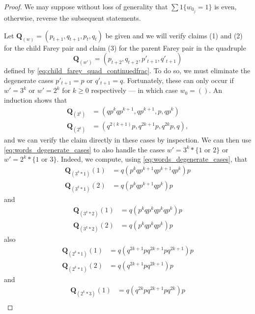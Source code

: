 \documentclass[12pt]{amsart}
\begin{document}
\begin{proof}
	We may suppose without loss of generality that $\sum 1\{w_{{0}_j}=1\}$ is even, otherwise, reverse the subsequent statements. 
	
	Let $\mathbf{Q}_{(w)} = (p_{t+1}, q_{t+1}, p_{t}, q_{t})$ be given and we will verify claims (1) and (2) for 
	the child Farey pair and claim (3) for the parent Farey pair  in the quadruple
	\[
	\mathbf{Q}_{(w')} = (p_{t+2}, q_{t+2}, p'_{t+1}, q'_{t+1})
	\]
	defined by \eqref{eq:child_farey_quad_continuedfrac}.  %
	To do so, we must eliminate the degenerate cases $p'_{t+1} = p$ or $q'_{t+1} = q$. Fortunately, 
	these can only occur if $w' = 3^k$ or $w' = 2^k$ for $k \geq 0 $ respectively --- in which case $w_0 = ()$. An induction shows that
	\begin{equation} \label{eq:words_degenerate_cases}
	\begin{aligned}
	\mathbf{Q}_{(3^k)} &= (q p^k q p^{k+1}, q p^{k+1}, p, q p^k) \\
	\mathbf{Q}_{(2^k)} &= (q^{2(k+1)} p, q^{2k + 1} p, q ^{2 k} p , q),
	\end{aligned}
	\end{equation}
	and we can verify the claim directly in these cases by inspection. We can then use \eqref{eq:words_degenerate_cases} to also handle the cases $w' = 3^k*\{1 \mbox{ or } 2\}$ or $w' = 2^k*\{1 \mbox{ or }3\}$. Indeed, we compute, using  \eqref{eq:words_degenerate_cases}, that 
	\[
	\begin{aligned}
	\mathbf{Q}_{(3^k*1)}(1) &= q (p^k q p^{k+1} q p^{k+1} q p^{k} )p \\
	\mathbf{Q}_{(3^k*1)}(2) &= q (p^k q p^{k+1} q p^{k}) p 
	\end{aligned}
	\]
	and
	\[
	\begin{aligned}
	\mathbf{Q}_{(3^k*2)}(1) &= q (p^k q p^k q p^k q p^k ) p  \\
	\mathbf{Q}_{(3^k*2)}(2) &= q (p^k q p^k q p^k ) p 
	\end{aligned}
	\]
	also
	\[
	\begin{aligned}
	\mathbf{Q}_{(2^k*1)}(1) &=  q ( q^{2 k + 1} p q^{2 k + 1} p q^{2 k + 1} ) p \\
	\mathbf{Q}_{(2^k*1)}(2) &=  q  (q^{2k+1} p q^{2k+1} ) p 
	\end{aligned}
	\]
	and
	\[
	\begin{aligned}
	\mathbf{Q}_{(2^k*3)}(1) &=  q ( q^{2k} p q^{2 k + 1} p q^{2k}) p \\

\end{aligned}\]
\end{proof}
\end{document}

